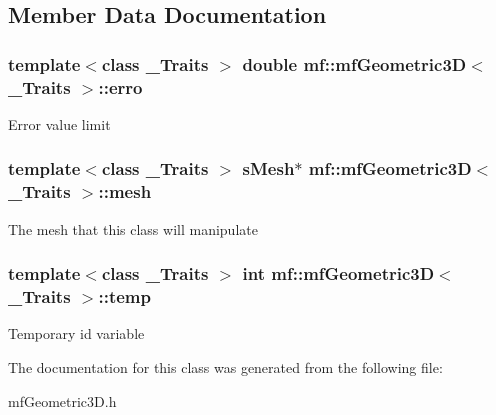 \subsection{Member Data Documentation}
\hypertarget{classmf_1_1mfGeometric3D_a1fadc92046a4a68ee309b1e8869f7526}{
\subsubsection[{erro}]{\setlength{\rightskip}{0pt plus 5cm}template$<$class \_\-Traits $>$ double {\bf mf::mfGeometric3D}$<$ \_\-Traits $>$::{\bf erro}}}
\label{classmf_1_1mfGeometric3D_a1fadc92046a4a68ee309b1e8869f7526}
Error value limit \hypertarget{classmf_1_1mfGeometric3D_aac2ef382fe6c85fb7061cf10579a44a3}{
\subsubsection[{mesh}]{\setlength{\rightskip}{0pt plus 5cm}template$<$class \_\-Traits $>$ {\bf sMesh}$\ast$ {\bf mf::mfGeometric3D}$<$ \_\-Traits $>$::{\bf mesh}}}
\label{classmf_1_1mfGeometric3D_aac2ef382fe6c85fb7061cf10579a44a3}
The mesh that this class will manipulate \hypertarget{classmf_1_1mfGeometric3D_ad5b7c474ec3793624e949b64c5e33527}{
\subsubsection[{temp}]{\setlength{\rightskip}{0pt plus 5cm}template$<$class \_\-Traits $>$ int {\bf mf::mfGeometric3D}$<$ \_\-Traits $>$::{\bf temp}}}
\label{classmf_1_1mfGeometric3D_ad5b7c474ec3793624e949b64c5e33527}
Temporary id variable 

The documentation for this class was generated from the following file:\begin{DoxyCompactItemize}
\item 
mfGeometric3D.h\end{DoxyCompactItemize}
